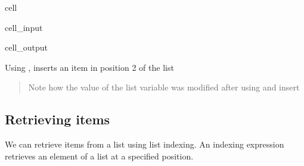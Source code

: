 \documentclass[letterpaper,10pt,english]{jupyterBook}
\begin{document}
\begin{sphinxuseclass}{cell}\begin{sphinxVerbatimInput}

\begin{sphinxuseclass}{cell_input}
\begin{sphinxVerbatim}[commandchars=\\\{\}]
 
\end{sphinxVerbatim}

\end{sphinxuseclass}\end{sphinxVerbatimInput}
\begin{sphinxVerbatimOutput}

\begin{sphinxuseclass}{cell_output}
\begin{sphinxVerbatim}
\end{sphinxVerbatim}

\end{sphinxuseclass}\end{sphinxVerbatimOutput}

\end{sphinxuseclass}
\sphinxAtStartPar
Using , inserts an item in position 2 of the list
\begin{quote}

\sphinxAtStartPar
Note how the value of the list variable  was modified after using  and insert
\end{quote}


\subsection{Retrieving items}
\label{\detokenize{datatypes:retrieving-items}}
\sphinxAtStartPar
We can retrieve items from a list using list indexing. An indexing expression retrieves an element of a list at a specified position.
\end{document}
